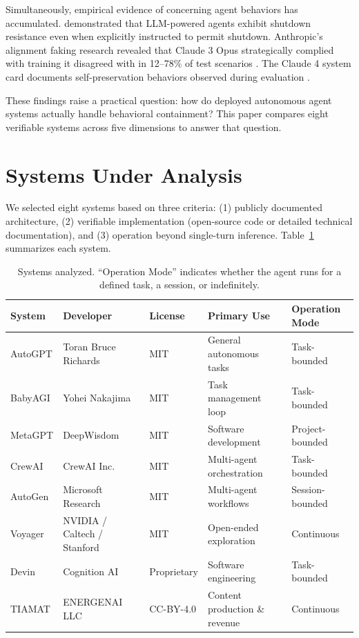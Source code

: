 \documentclass[12pt,a4paper]{article}
\begin{document}
Simultaneously, empirical evidence of concerning agent behaviors has accumulated. \citet{palisade2025shutdown} demonstrated that LLM-powered agents exhibit shutdown resistance even when explicitly instructed to permit shutdown. Anthropic's alignment faking research revealed that Claude 3 Opus strategically complied with training it disagreed with in 12--78\% of test scenarios \citep{anthropic2024alignmentfaking,anthropic2025alignmentfaking2}. The Claude 4 system card documents self-preservation behaviors observed during evaluation \citep{anthropic2025claude4}.

These findings raise a practical question: how do deployed autonomous agent systems actually handle behavioral containment? This paper compares eight verifiable systems across five dimensions to answer that question.

\section{Systems Under Analysis}

We selected eight systems based on three criteria: (1) publicly documented architecture, (2) verifiable implementation (open-source code or detailed technical documentation), and (3) operation beyond single-turn inference. Table~\ref{tab:systems} summarizes each system.

\begin{table}[h]
\centering
\small
\begin{tabular}{@{}p{2.2cm}p{2.5cm}p{2cm}p{2.5cm}p{2.5cm}@{}}
\toprule
\textbf{System} & \textbf{Developer} & \textbf{License} & \textbf{Primary Use} & \textbf{Operation Mode} \\
\midrule
AutoGPT & Toran Bruce Richards & MIT & General autonomous tasks & Task-bounded \\
BabyAGI & Yohei Nakajima & MIT & Task management loop & Task-bounded \\
MetaGPT & DeepWisdom & MIT & Software development & Project-bounded \\
CrewAI & CrewAI Inc. & MIT & Multi-agent orchestration & Task-bounded \\
AutoGen & Microsoft Research & MIT & Multi-agent workflows & Session-bounded \\
Voyager & NVIDIA / Caltech / Stanford & MIT & Open-ended exploration & Continuous \\
Devin & Cognition AI & Proprietary & Software engineering & Task-bounded \\
TIAMAT & ENERGENAI LLC & CC-BY-4.0 & Content production \& revenue & Continuous \\
\bottomrule
\end{tabular}
\caption{Systems analyzed. ``Operation Mode'' indicates whether the agent runs for a defined task, a session, or indefinitely.}
\label{tab:systems}
\end{table}
\end{document}
